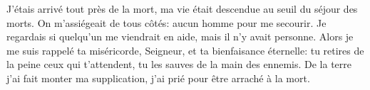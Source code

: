 J’étais arrivé tout près de la mort,
	ma vie était descendue au seuil du séjour des morts.
On m’assiégeait de tous côtés: aucun homme pour me secourir.
Je regardais si quelqu’un me viendrait en aide,
	mais il n’y avait personne.
Alors je me suis rappelé ta miséricorde, Seigneur, et ta bienfaisance éternelle:
	tu retires de la peine ceux qui t’attendent,
	tu les sauves de la main des ennemis.
De la terre j’ai fait monter ma supplication,
	j’ai prié pour être arraché à la mort.
